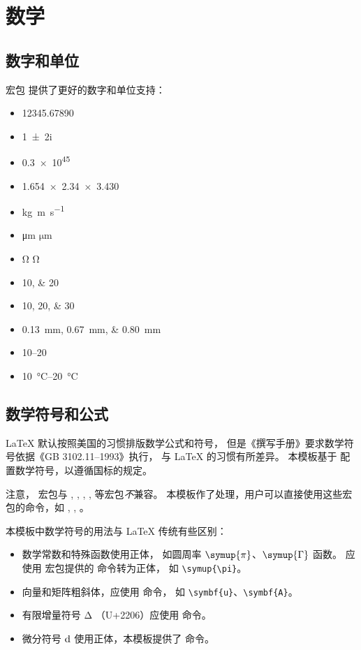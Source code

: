 
\chapter{数学}

\section{数字和单位}

宏包  提供了更好的数字和单位支持：
\begin{itemize}
  \item \num{12345.67890}
  \item \num{1+-2i}
  \item \num{.3e45}
  \item \num{1.654 x 2.34 x 3.430}
  \item \si{kg.m.s^{-1}}
  \item \si{\micro\meter} $\si{\micro\meter}$
  \item \si{\ohm} $\si{\ohm}$
  \item \numlist{10;20}
  \item \numlist{10;20;30}
  \item \SIlist{0.13;0.67;0.80}{\milli\metre}
  \item \numrange{10}{20}
  \item \SIrange{10}{20}{\degreeCelsius}
\end{itemize}



\section{数学符号和公式}

\LaTeX{} 默认按照美国的习惯排版数学公式和符号，
但是《撰写手册》要求数学符号依据《GB 3102.11--1993》执行，
与 \LaTeX{} 的习惯有所差异。
本模板基于  配置数学符号，以遵循国标的规定。

注意， 宏包与 , , ,
,  等宏包\emph{不}兼容。
本模板作了处理，用户可以直接使用这些宏包的命令，如 , ,
。

本模板中数学符号的用法与 \LaTeX{} 传统有些区别：
\begin{itemize}
  \item 数学常数和特殊函数使用正体，
    如圆周率 $\symup{\pi}$、$\symup{\Gamma}$ 函数。
    应使用  宏包提供的  命令转为正体，
    如 \verb|\symup{\pi}|。
  \item 向量和矩阵粗斜体，应使用  命令，
    如 \verb|\symbf{u}|、\verb|\symbf{A}|。
  \item 有限增量符号 $\increment$ （U+2206）应使用  命令。
  \item 微分符号 $\mathop{}\!\mathrm{d}$ 使用正体，本模板提供了  命令。
\end{itemize}

